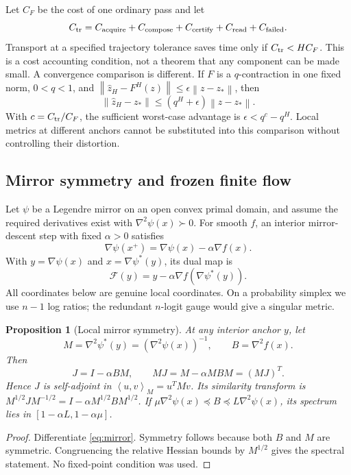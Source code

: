 \documentclass[journal]{IEEEtran}
\newtheorem{proposition}[theorem]{Proposition}
\theoremstyle{definition}
\newcommand{\norm}[1]{\left\lVert#1\right\rVert}
\newcommand{\ip}[2]{\left\langle#1,#2\right\rangle}
\newcommand{\F}{\mathcal{F}}
\begin{document}
Let $C_F$ be the cost of one ordinary pass and let
\begin{equation}
 C_{\rm tr}=C_{\rm acquire}+C_{\rm compose}+C_{\rm certify}
             +C_{\rm read}+C_{\rm failed}.\label{eq:totalcost}
\end{equation}
Transport at a specified trajectory tolerance saves time only if
$C_{\rm tr}<HC_F$. This is a cost accounting condition, not a theorem
that any component can be made small. A convergence comparison is different.
If $F$ is a $q$-contraction in one fixed norm, $0<q<1$, and
$\norm{\widehat z_H-F^H(z)}\leq\epsilon\norm{z-z_*}$, then
\[
 \norm{\widehat z_H-z_*}\leq(q^H+\epsilon)\norm{z-z_*}.
\]
With $c=C_{\rm tr}/C_F$, the sufficient worst-case advantage is
$\epsilon<q^c-q^H$. Local metrics at different anchors cannot be substituted
into this comparison without controlling their distortion.

\subsection{Mirror symmetry and frozen finite flow}
Let $\psi$ be a Legendre mirror on an open convex primal domain, and assume
the required derivatives exist with $\nabla^2\psi(x)\succ0$. For smooth $f$,
an interior mirror-descent step with fixed $\alpha>0$ satisfies
\begin{equation}
 \nabla\psi(x^+)=\nabla\psi(x)-\alpha\nabla f(x).
\end{equation}
With $y=\nabla\psi(x)$ and $x=\nabla\psi^*(y)$, its dual map is
\begin{equation}
 \F(y)=y-\alpha\nabla f(\nabla\psi^*(y)). \label{eq:mirror}
\end{equation}
All coordinates below are genuine local coordinates. On a probability
simplex we use $n-1$ log ratios; the redundant $n$-logit gauge would give a
singular metric.

\begin{proposition}[Local mirror symmetry]\label{prop:symmetry}
At any interior anchor $y$, let
\[
 M=\nabla^2\psi^*(y)=(\nabla^2\psi(x))^{-1},\qquad B=\nabla^2 f(x).
\]
Then
\begin{equation}
 J=I-\alpha BM,\qquad MJ=M-\alpha MBM=(MJ)^T. \label{eq:symmetry}
\end{equation}
Hence $J$ is self-adjoint in $\ip{u}{v}_M=u^TMv$. Its similarity transform is
$M^{1/2}JM^{-1/2}=I-\alpha M^{1/2}BM^{1/2}$.
If $\mu\nabla^2\psi(x)\preceq B\preceq L\nabla^2\psi(x)$,
its spectrum lies in $[1-\alpha L,1-\alpha\mu]$.
\end{proposition}
\begin{proof}
Differentiate \eqref{eq:mirror}. Symmetry follows because both $B$ and $M$
are symmetric. Congruencing the relative Hessian bounds by $M^{1/2}$ gives
the spectral statement. No fixed-point condition was used.
\end{proof}
\end{document}
